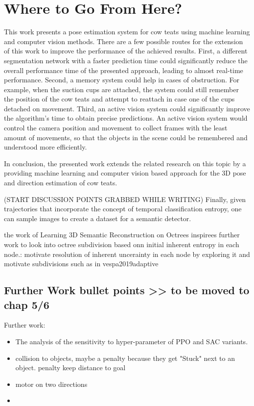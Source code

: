 \section{Where to Go From Here?}\label{sec:future-work}
    This work presents a pose estimation system for cow teats using machine learning and computer vision methods. There are a few possible routes for the extension of this work to improve the performance of the achieved results. First, a different segmentation network with a faster prediction time could significantly reduce the overall performance time of the presented approach, leading to almost real-time performance. Second, a memory system could help in cases of obstruction. For example, when the suction cups are attached, the system could still remember the position of the cow teats and attempt to reattach in case one of the cups detached on movement. Third, an active vision system could significantly improve the algorithm's time to obtain precise predictions. An active vision system would control the camera position and movement to collect frames with the least amount of movements, so that the objects in the scene could be remembered and understood more efficiently.
    
    In conclusion, the presented work extends the related research on this topic by a providing machine learning and computer vision based approach for the 3D pose and direction estimation of cow teats.
    
    (START DISCUSSION POINTS GRABBED WHILE WRITING)
    Finally, given trajectories that incorporate the concept of temporal classification entropy, one can sample images to create a dataset for a semantic detector. 
    
    the work of Learning 3D Semantic Reconstruction on Octrees inspirees further work to look into octree subdivision based onn initial inherent entropy in each node.: motivate resolution of inherent uncerainty in each node by exploring it and motivate subdivisions such as in vespa2019adaptive


    \subsection{Further Work bullet points >> to be moved to chap 5/6}
    Further work:
    \begin{itemize}
        \item The analysis of the sensitivity to hyper-parameter of PPO and SAC variants.
        \item collision to objects, maybe a penalty because they get "Stuck" next to an object. penalty keep distance to goal
        \item motor on two directions
        \item 
    \end{itemize}
    
